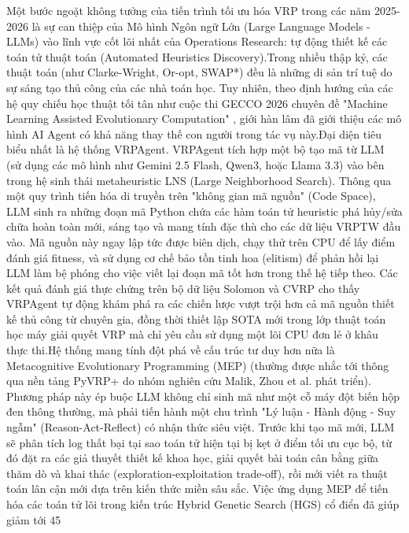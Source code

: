 \documentclass[13pt, a4paper]{extarticle} %
\begin{document}
Một bước ngoặt không tưởng của tiến trình tối ưu hóa VRP trong các năm 2025-2026 là sự can thiệp của Mô hình Ngôn ngữ Lớn (Large Language Models - LLMs) vào lĩnh vực cốt lõi nhất của Operations Research: tự động thiết kế các toán tử thuật toán (Automated Heuristics Discovery).Trong nhiều thập kỷ, các thuật toán (như Clarke-Wright, Or-opt, SWAP*) đều là những di sản trí tuệ do sự sáng tạo thủ công của các nhà toán học. Tuy nhiên, theo định hướng của các hệ quy chiếu học thuật tối tân như cuộc thi GECCO 2026 chuyên đề "Machine Learning Assisted Evolutionary Computation" , giới hàn lâm đã giới thiệu các mô hình AI Agent có khả năng thay thế con người trong tác vụ này.Đại diện tiêu biểu nhất là hệ thống VRPAgent. VRPAgent tích hợp một bộ tạo mã từ LLM (sử dụng các mô hình như Gemini 2.5 Flash, Qwen3, hoặc Llama 3.3) vào bên trong hệ sinh thái metaheuristic LNS (Large Neighborhood Search). Thông qua một quy trình tiến hóa di truyền trên "không gian mã nguồn" (Code Space), LLM sinh ra những đoạn mã Python chứa các hàm toán tử heuristic phá hủy/sửa chữa hoàn toàn mới, sáng tạo và mang tính đặc thù cho các dữ liệu VRPTW đầu vào. Mã nguồn này ngay lập tức được biên dịch, chạy thử trên CPU để lấy điểm đánh giá fitness, và sử dụng cơ chế bảo tồn tinh hoa (elitism) để phản hồi lại LLM làm bệ phóng cho việc viết lại đoạn mã tốt hơn trong thế hệ tiếp theo. Các kết quả đánh giá thực chứng trên bộ dữ liệu Solomon và CVRP cho thấy VRPAgent tự động khám phá ra các chiến lược vượt trội hơn cả mã nguồn thiết kế thủ công từ chuyên gia, đồng thời thiết lập SOTA mới trong lớp thuật toán học máy giải quyết VRP mà chỉ yêu cầu sử dụng một lõi CPU đơn lẻ ở khâu thực thi.Hệ thống mang tính đột phá về cấu trúc tư duy hơn nữa là Metacognitive Evolutionary Programming (MEP) (thường được nhắc tới thông qua nền tảng PyVRP+ do nhóm nghiên cứu Malik, Zhou et al. phát triển). Phương pháp này ép buộc LLM không chỉ sinh mã như một cỗ máy đột biến hộp đen thông thường, mà phải tiến hành một chu trình "Lý luận - Hành động - Suy ngẫm" (Reason-Act-Reflect) có nhận thức siêu việt. Trước khi tạo mã mới, LLM sẽ phân tích log thất bại tại sao toán tử hiện tại bị kẹt ở điểm tối ưu cục bộ, từ đó đặt ra các giả thuyết thiết kế khoa học, giải quyết bài toán cân bằng giữa thăm dò và khai thác (exploration-exploitation trade-off), rồi mới viết ra thuật toán lân cận mới dựa trên kiến thức miền sâu sắc. Việc ứng dụng MEP để tiến hóa các toán tử lõi trong kiến trúc Hybrid Genetic Search (HGS) cổ điển đã giúp giảm tới 45%
\end{document}
